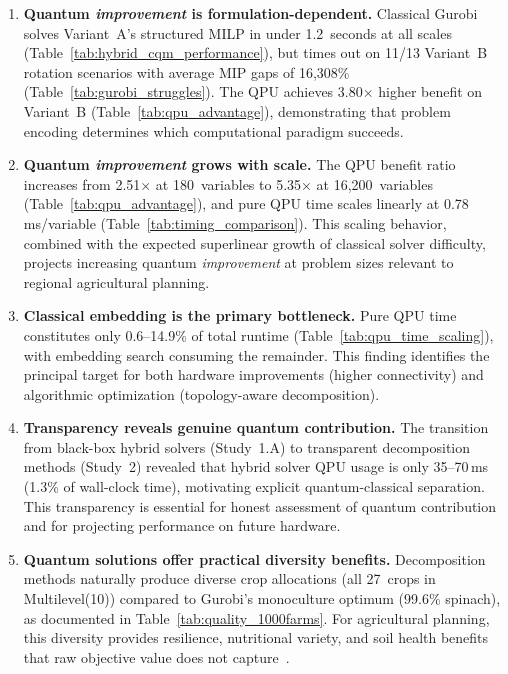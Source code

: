 \begin{enumerate}
    \item \textbf{Quantum \textit{improvement} is formulation-dependent.} Classical Gurobi solves Variant~A's structured MILP in under 1.2~seconds at all scales (Table~\ref{tab:hybrid_cqm_performance}), but times out on 11/13 Variant~B rotation scenarios with average MIP gaps of 16,308\% (Table~\ref{tab:gurobi_struggles}). The QPU achieves 3.80$\times$ higher benefit on Variant~B (Table~\ref{tab:qpu_advantage}), demonstrating that problem encoding determines which computational paradigm succeeds.

    \item \textbf{Quantum \textit{improvement} grows with scale.} The QPU benefit ratio increases from 2.51$\times$ at 180~variables to 5.35$\times$ at 16,200~variables (Table~\ref{tab:qpu_advantage}), and pure QPU time scales linearly at 0.78\,ms/variable (Table~\ref{tab:timing_comparison}). This scaling behavior, combined with the expected superlinear growth of classical solver difficulty, projects increasing quantum \textit{improvement} at problem sizes relevant to regional agricultural planning.

    \item \textbf{Classical embedding is the primary bottleneck.} Pure QPU time constitutes only 0.6--14.9\% of total runtime (Table~\ref{tab:qpu_time_scaling}), with embedding search consuming the remainder. This finding identifies the principal target for both hardware improvements (higher connectivity) and algorithmic optimization (topology-aware decomposition).

    \item \textbf{Transparency reveals genuine quantum contribution.} The transition from black-box hybrid solvers (Study~1.A) to transparent decomposition methods (Study~2) revealed that hybrid solver QPU usage is only 35--70\,ms (1.3\% of wall-clock time), motivating explicit quantum-classical separation. This transparency is essential for honest assessment of quantum contribution and for projecting performance on future hardware.

    \item \textbf{Quantum solutions offer practical diversity benefits.} Decomposition methods naturally produce diverse crop allocations (all 27~crops in Multilevel(10)) compared to Gurobi's monoculture optimum (99.6\% spinach), as documented in Table~\ref{tab:quality_1000farms}. For agricultural planning, this diversity provides resilience, nutritional variety, and soil health benefits that raw objective value does not capture~\cite{lin2011resilience, bowles2020longterm}.


\end{enumerate}
